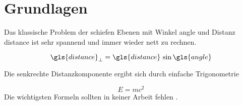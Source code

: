 
\chapter{Grundlagen}
\label{sec:theory}
Das klassische Problem der schiefen Ebenen mit Winkel \gls{angle} und Distanz
\gls{distance} ist sehr spannend und immer wieder nett zu rechnen.

\begin{equation}
  \gls{distance}_\perp = \gls{distance} \, \sin{\gls{angle}}
  \label{eq:perpendicular}
\end{equation}

Die senkrechte Distanzkomponente ergibt sich durch einfache Trigonometrie

\begin{equation}
  E=m c^2
  \label{eq:longTongue}
\end{equation}
Die wichtigsten Formeln sollten in keiner Arbeit fehlen .

\Blindtext[4][2]
